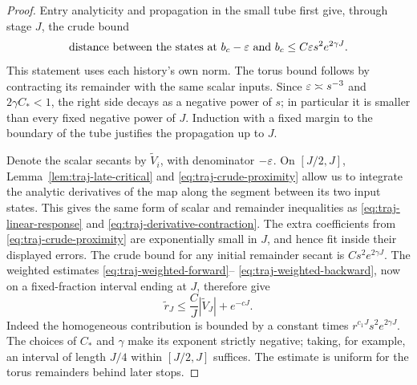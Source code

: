 \begin{proof}
Entry analyticity and propagation in the small tube first give,
through stage \(J\), the crude bound
\begin{equation}\label{eq:traj-crude-proximity}
 \text{distance between the states at \(b_c-\varepsilon\) and \(b_c\)}
       \le C\varepsilon s^2e^{2\gamma J}.
\end{equation}
This statement uses each history's own norm.  The torus bound follows
by contracting its remainder with the same scalar inputs.  Since
\(\varepsilon\asymp s^{-3}\) and \(2\gamma C_*<1\), the right side
decays as a negative power of \(s\); in particular it is smaller
than every fixed negative power of \(J\).  Induction with a fixed
margin to the boundary of the tube justifies the propagation up to
\(J\).

Denote the scalar secants by \(\widetilde V_i\), with denominator
\(-\varepsilon\).  On \([J/2,J]\), Lemma~\ref{lem:traj-late-critical}
and \eqref{eq:traj-crude-proximity} allow us to integrate the
analytic derivatives of the map along the segment between its two
input states.  This gives the same form of scalar and remainder
inequalities as \eqref{eq:traj-linear-response} and
\eqref{eq:traj-derivative-contraction}.  The extra coefficients
from \eqref{eq:traj-crude-proximity} are exponentially small in
\(J\), and hence fit inside their displayed errors.  The crude
bound for any initial remainder secant is \(Cs^2e^{2\gamma J}\).
The weighted estimates \eqref{eq:traj-weighted-forward}--
\eqref{eq:traj-weighted-backward}, now on a fixed-fraction interval
ending at \(J\), therefore give
\begin{equation}\label{eq:traj-secant-slaving}
 \widetilde r_J\le\frac CJ|\widetilde V_J|+e^{-cJ}.
\end{equation}
Indeed the homogeneous contribution is bounded by a constant times
\(r^{c_1J}s^2e^{2\gamma J}\).  The choices of \(C_*\) and
\(\gamma\) make its exponent strictly negative; taking, for
example, an interval of length \(J/4\) within \([J/2,J]\)
suffices.  The estimate is uniform for the torus remainders behind
later stops.


\end{proof}
